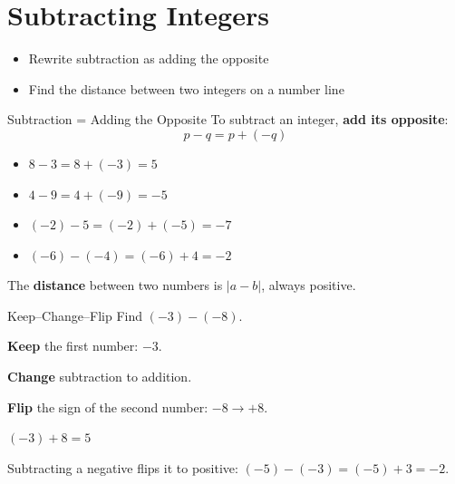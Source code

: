 \section{Subtracting Integers}

\begin{learningGoals}
\begin{itemize}
    \item Rewrite subtraction as adding the opposite
    \item Find the distance between two integers on a number line
\end{itemize}
\end{learningGoals}

\begin{conceptBox}{Subtraction = Adding the Opposite}
To subtract an integer, \textbf{add its opposite}:
$$p - q = p + (-q)$$
\begin{itemize}[leftmargin=*]
    \item $8 - 3 = 8 + (-3) = 5$
    \item $4 - 9 = 4 + (-9) = -5$
    \item $(-2) - 5 = (-2) + (-5) = -7$
    \item $(-6) - (-4) = (-6) + 4 = -2$
\end{itemize}
The \textbf{distance} between two numbers is $|a - b|$, always positive.
\end{conceptBox}

\begin{workedExample}{Keep--Change--Flip}
Find $(-3) - (-8)$.

\textbf{Keep} the first number: $-3$.

\textbf{Change} subtraction to addition.

\textbf{Flip} the sign of the second number: $-8 \to +8$.

$(-3) + 8 = 5$
\end{workedExample}

\begin{errorBox}
Subtracting a negative flips it to positive: $(-5) - (-3) = (-5) + 3 = -2$.
\end{errorBox}

